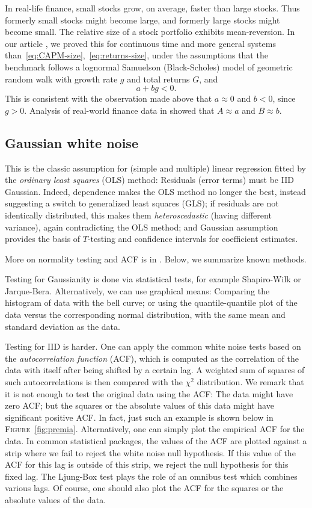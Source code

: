 \documentclass[12pt]{amsart}
\begin{document}
In real-life finance, small stocks grow, on average, faster than large stocks. Thus formerly small stocks might become large, and formerly large stocks might become small. The relative size of a stock portfolio exhibits mean-reversion. In our article \cite{CAPM-size}, we proved this for continuous time and more general systems than~\eqref{eq:CAPM-size},~\eqref{eq:returns-size}, under the assumptions that the benchmark follows a lognormal Samuelson (Black-Scholes) model of geometric random walk with growth rate $g$ and total returns $G$, and 
\begin{equation}
\label{eq:stability}
a + bg < 0.
\end{equation}
This is consistent with the observation made above that $a \approx 0$ and $b < 0$, since $g > 0$. Analysis of real-world finance data in \cite{CAPM-size} showed that $A \approx a$ and $B \approx b$. 

\subsection{Gaussian white noise} This is the classic assumption for (simple and multiple) linear regression fitted by the {\it ordinary least squares} (OLS) method: Residuals (error terms) must be IID Gaussian. Indeed, dependence makes the OLS method no longer the best, instead suggesting a switch to generalized least squares (GLS); if residuals are not identically distributed, this makes them {\it heteroscedastic} (having different variance), again contradicting the OLS method; and Gaussian assumption provides the basis of $T$-testing and confidence intervals for coefficient estimates. 

More on normality testing and ACF is in \cite{FanYao}. Below, we summarize  known methods.

Testing for Gaussianity is done via statistical tests, for example Shapiro-Wilk or Jarque-Bera. Alternatively, we can use graphical means: Comparing the histogram of data with the bell curve; or using the quantile-quantile plot of the data versus the corresponding normal distribution, with the same mean and standard deviation as the data.

Testing for IID is harder. One can apply the common white noise tests based on the {\it autocorrelation function} (ACF), which is computed as the correlation of the data with itself after being shifted by a certain lag. A weighted sum of squares of such autocorrelations is then compared with the 
$\chi^2$ distribution. We remark that it is not enough to test the original data using the ACF: The data might have zero ACF; but the squares or the absolute values of this data might have significant positive ACF. In fact, just such an example is shown below in \textsc{Figure}~\ref{fig:premia}.  Alternatively, one can simply plot the empirical ACF for the data. In common statistical packages, the values of the ACF are plotted against a strip where we fail to reject the white noise null hypothesis. If this value of the ACF for this lag is outside of this strip, we reject the null hypothesis for this fixed lag. The Ljung-Box test plays the role of an omnibus test which combines various lags. Of course, one should also plot the ACF for the squares or the absolute values of the data.
\end{document}
